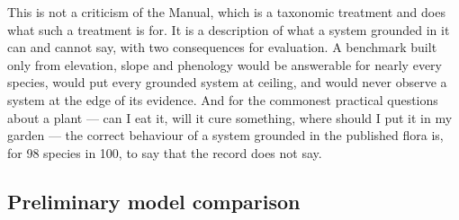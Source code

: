 \documentclass[11pt,a4paper]{article}
\begin{document}
This is not a criticism of the Manual, which is a taxonomic treatment and does what
such a treatment is for. It is a description of what a system grounded in it can and
cannot say, with two consequences for evaluation. A benchmark built only from
elevation, slope and phenology would be answerable for nearly every species, would
put every grounded system at ceiling, and would never observe a system at the edge of
its evidence. And for the commonest practical questions about a plant --- can I eat
it, will it cure something, where should I put it in my garden --- the correct
behaviour of a system grounded in the published flora is, for 98 species in 100, to
say that the record does not say.

\subsection{Preliminary model comparison}\label{sec:prelim}
\end{document}
